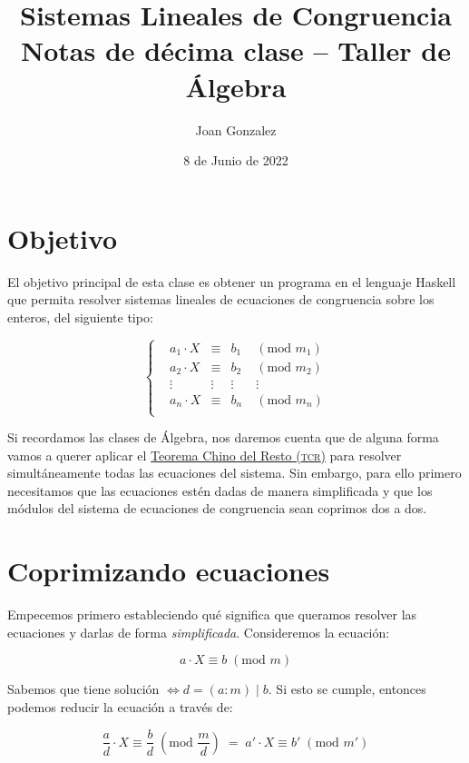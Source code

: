 \documentclass{article}
\title{
  Sistemas Lineales de Congruencia \\
  \large Notas de décima clase \textbf{--} Taller de Álgebra \\}
\author{Joan Gonzalez}
\date{8 de Junio de 2022}
\newcommand{\nln}{\par\vspace{3mm}}
\begin{document}
\maketitle
\newpage

\section{Objetivo}
El objetivo principal de esta clase es obtener un programa en el lenguaje Haskell que permita resolver sistemas lineales de ecuaciones de congruencia sobre los enteros, del siguiente tipo:

\begin{equation*}
\left\{\begin{matrix}
 &a_1 \cdot X &\equiv &b_1 \; &(\text{mod } m_1)  \\
 &a_2 \cdot X &\equiv &b_2 \; &(\text{mod } m_2)  \\
 &\vdots      &\vdots &\vdots &\vdots             \\
 &a_n \cdot X &\equiv &b_n \; &(\text{mod } m_n)  \\
\end{matrix}\right.
\end{equation*}
\nln

Si recordamos las clases de Álgebra, nos daremos cuenta que de alguna forma vamos a querer aplicar el \href{https://es.wikipedia.org/wiki/Teorema_chino_del_resto?oldformat=true}{Teorema Chino del Resto (\textsc{tcr})} para resolver simultáneamente todas las ecuaciones del sistema.
Sin embargo, para ello primero necesitamos que las ecuaciones estén dadas de manera simplificada y que los módulos del sistema de ecuaciones de congruencia sean coprimos dos a dos.

\section{Coprimizando ecuaciones}
Empecemos primero estableciendo qué significa que queramos resolver las ecuaciones y darlas de forma \textit{simplificada}. Consideremos la ecuación:

\begin{equation} \label{modularEquation}
    a \cdot X \equiv b \; (\text{mod } m)
\end{equation}

Sabemos que tiene solución $\iff d = (a:m) \mid b$. Si esto se cumple, entonces podemos reducir la ecuación a través de:

\begin{equation} \label{coprimes}
    \frac{a}{d} \cdot X \equiv \frac{b}{d} \; (\text{mod } \frac{m}{d}) \; = \; 
    a' \cdot X \equiv b' \; (\text{mod } m')
\end{equation}
\nln
\end{document}
